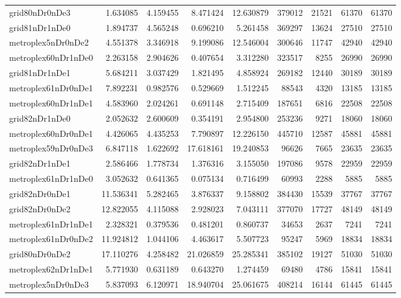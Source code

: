 \begin{longtable}{|l|r|r|r|r|r|r|r|r|}
grid80nDr0nDe3 & 1.634085 & 4.159455 & 8.471424 & 12.630879 & 379012 & 21521 & 61370 & 61370 \\
grid81nDr1nDe0 & 1.894737 & 4.565248 & 0.696210 & 5.261458 & 369297 & 13624 & 27510 & 27510 \\
metroplex5nDr0nDe2 & 4.551378 & 3.346918 & 9.199086 & 12.546004 & 300646 & 11747 & 42940 & 42940 \\
metroplex60nDr1nDe0 & 2.263158 & 2.904626 & 0.407654 & 3.312280 & 323517 & 8255 & 26990 & 26990 \\
grid81nDr1nDe1 & 5.684211 & 3.037429 & 1.821495 & 4.858924 & 269182 & 12440 & 30189 & 30189 \\
metroplex61nDr0nDe1 & 7.892231 & 0.982576 & 0.529669 & 1.512245 & 88543 & 4320 & 13185 & 13185 \\
metroplex60nDr1nDe1 & 4.583960 & 2.024261 & 0.691148 & 2.715409 & 187651 & 6816 & 22508 & 22508 \\
grid82nDr1nDe0 & 2.052632 & 2.600609 & 0.354191 & 2.954800 & 253236 & 9271 & 18060 & 18060 \\
metroplex60nDr0nDe1 & 4.426065 & 4.435253 & 7.790897 & 12.226150 & 445710 & 12587 & 45881 & 45881 \\
metroplex59nDr0nDe3 & 6.847118 & 1.622692 & 17.618161 & 19.240853 & 96626 & 7665 & 23635 & 23635 \\
grid82nDr1nDe1 & 2.586466 & 1.778734 & 1.376316 & 3.155050 & 197086 & 9578 & 22959 & 22959 \\
metroplex61nDr1nDe0 & 3.052632 & 0.641365 & 0.075134 & 0.716499 & 60993 & 2288 & 5885 & 5885 \\
grid82nDr0nDe1 & 11.536341 & 5.282465 & 3.876337 & 9.158802 & 384430 & 15539 & 37767 & 37767 \\
grid82nDr0nDe2 & 12.822055 & 4.115088 & 2.928023 & 7.043111 & 377070 & 17727 & 48149 & 48149 \\
metroplex61nDr1nDe1 & 2.328321 & 0.379536 & 0.481201 & 0.860737 & 34653 & 2637 & 7241 & 7241 \\
metroplex61nDr0nDe2 & 11.924812 & 1.044106 & 4.463617 & 5.507723 & 95247 & 5969 & 18834 & 18834 \\
grid80nDr0nDe2 & 17.110276 & 4.258482 & 21.026859 & 25.285341 & 385102 & 19127 & 51030 & 51030 \\
metroplex62nDr1nDe1 & 5.771930 & 0.631189 & 0.643270 & 1.274459 & 69480 & 4786 & 15841 & 15841 \\
metroplex5nDr0nDe3 & 5.837093 & 6.120971 & 18.940704 & 25.061675 & 408214 & 16144 & 61445 & 61445 \\

\end{longtable}
